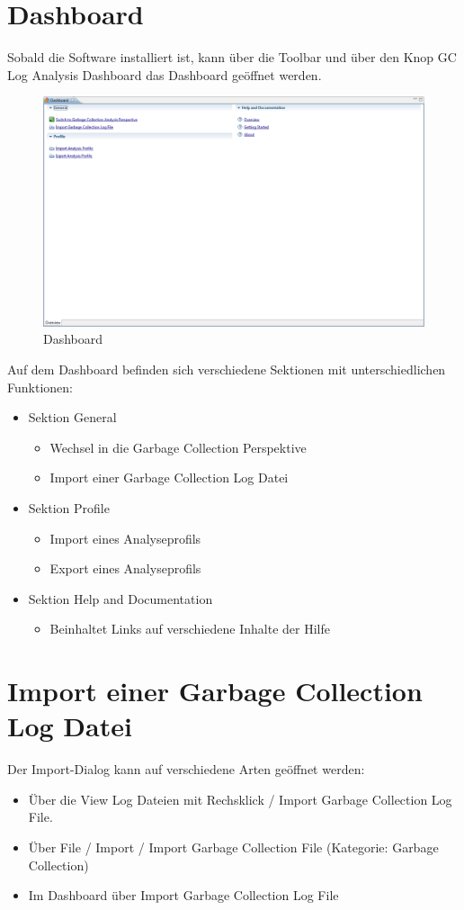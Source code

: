 \section{Dashboard}
Sobald die Software installiert ist, kann über die Toolbar und über den Knop GC Log Analysis Dashboard das Dashboard geöffnet werden. 
 \begin{figure}[H]
  	\centering
    	\includegraphics[width=16cm]{images/tutorial_dashboard}
        	\caption{Dashboard}
\end{figure}

Auf dem Dashboard befinden sich verschiedene Sektionen mit unterschiedlichen Funktionen:
\begin{itemize}
	\item Sektion General 
		\begin{itemize}
			\item Wechsel in die Garbage Collection Perspektive
			\item Import einer Garbage Collection Log Datei
		\end{itemize}
	\item Sektion Profile
		\begin{itemize}
			\item Import eines Analyseprofils
			\item Export eines Analyseprofils
		\end{itemize}
	\item Sektion Help and Documentation
		\begin{itemize}
			\item Beinhaltet Links auf verschiedene Inhalte der Hilfe
		\end{itemize}
\end{itemize}

\section{Import einer Garbage Collection Log Datei}
Der Import-Dialog kann auf verschiedene Arten geöffnet werden:
\begin{itemize}
	\item Über die View Log Dateien mit Rechsklick / Import Garbage Collection Log File.
	\item Über File / Import / Import Garbage Collection File (Kategorie: Garbage Collection)
	\item Im Dashboard über Import Garbage Collection Log File
\end{itemize}

